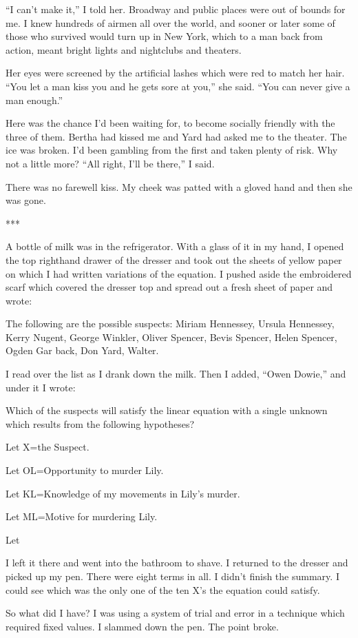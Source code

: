 \documentclass{novel}
\begin{document}
{“I can’t make it,” I told her. Broadway and public places were out of bounds for me. I knew hundreds of airmen all over the world, and sooner or later some of those who survived would turn up in New York, which to a man back from action, meant bright lights and nightclubs and theaters.

Her eyes were screened by the artificial lashes which were red to match her hair. “You let a man kiss you and he gets sore at you,” she said. “You can never give a man enough.”

Here was the chance I’d been waiting for, to become socially friendly with the three of them. Bertha had kissed me and Yard had asked me to the theater. The ice was broken. I’d been gambling from the first and taken plenty of risk. Why not a little more? “All right, I’ll be there,” I said.

There was no farewell kiss. My cheek was patted with a gloved hand and then she was gone.

***

A bottle of milk was in the refrigerator. With a glass of it in my hand, I opened the top righthand drawer of the dresser and took out the sheets of yellow paper on which I had written variations of the equation. I pushed aside the embroidered scarf which covered the dresser top and spread out a fresh sheet of paper and wrote:

The following are the possible suspects: Miriam Hennessey, Ursula Hennessey, Kerry Nugent, George Winkler, Oliver Spencer, Bevis Spencer, Helen Spencer, Ogden Gar back, Don Yard, Walter.

I read over the list as I drank down the milk. Then I added, “Owen Dowie,” and under it I wrote:

Which of the suspects will satisfy the linear equation with a single unknown which results from the following hypotheses?

Let X=the Suspect.

Let OL=Opportunity to murder Lily.

Let KL=Knowledge of my movements in Lily’s murder.

Let ML=Motive for murdering Lily.

Let

I left it there and went into the bathroom to shave. I returned to the dresser and picked up my pen. There were eight terms in all. I didn’t finish the summary. I could see which was the only one of the ten X’s the equation could satisfy.

So what did I have? I was using a system of trial and error in a technique which required fixed values. I slammed down the pen. The point broke.

}
\end{document}
